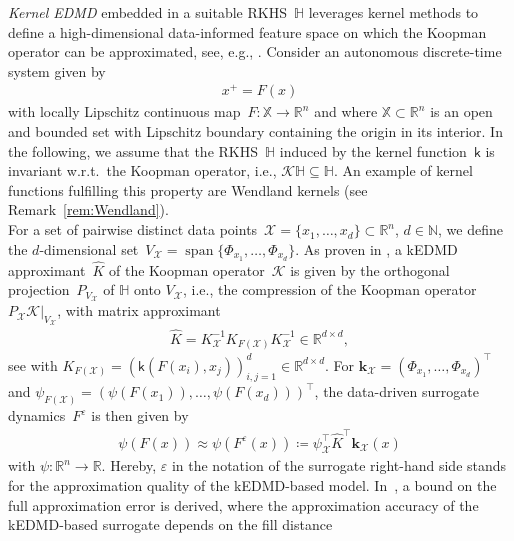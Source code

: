 \documentclass[a4paper, reqno]{amsart}
\newcommand{\R}{\ensuremath{\mathbb R}}
\newcommand{\N}{\ensuremath{\mathbb N}}
\renewcommand{\k}{\mathsf{k}}
\begin{document}
\textit{Kernel EDMD} embedded in a suitable RKHS~$\mathbb{H}$ leverages kernel methods to define a high-dimensional data-informed feature space on which the Koopman operator can be approximated, see, e.g., \cite{will2015kernel,klus2020kernel}. 
Consider an autonomous discrete-time system given by 
\begin{align}\label{eq:sys:ADT}%
    x^+ = F(x)
\end{align}
with locally Lipschitz continuous map~$F:\mathbb{X} \rightarrow \R^n$ and where $\mathbb{X} \subset \R^n$ is an open and bounded set with Lipschitz boundary containing the origin in its interior. In the following, we assume that the RKHS~$\mathbb{H}$ induced by the kernel function~$\k$ is invariant w.r.t.\ the Koopman operator, i.e., $\mathcal{K}\mathbb{H} \subseteq \mathbb{H}$. An example of kernel functions fulfilling this property are Wendland kernels (see Remark~\ref{rem:Wendland}).\\
For a set of pairwise distinct data points~$\mathcal{X} = \{x_1, \dots, x_d\}\subset\R^n$, $d \in \N$, we define the $d$-dimensional set~$V_\mathcal{X} = \operatorname{span}\{\Phi_{x_1}, \dots, \Phi_{x_d}\}$. As proven in \cite[Proposition 3.2]{kohne2025error}, a kEDMD approximant~$\widehat{K}$ of the Koopman operator~$\mathcal{K}$ is given by the orthogonal projection~$P_{V_\mathcal{X}}$ of $\mathbb{H}$ onto $V_\mathcal{X}$, i.e., the compression of the  Koopman operator~$P_\mathcal{X}\mathcal{K}|_{V_{\mathcal{X}}}$, 
with matrix approximant 
\begin{align*}
    \widehat{K} = K_\mathcal{X}^{-1}K_{F(\mathcal{X})}K_\mathcal{X}^{-1} \in \R^{d \times d},
\end{align*}
see \cite{kohne2025error} with $K_{F(\mathcal{X})} = (\k(F(x_i), x_j))_{i, j = 1}^d \in \R^{d \times d}$. 
For 
$\mathbf{k}_\mathcal{X} = (\Phi_{x_1}, \dots, \Phi_{x_d})^\top$ and $\psi_{F(\mathcal{X})} = (\psi(F(x_1)), \dots, \psi(F(x_d)))^\top$, the data-driven surrogate dynamics~$F^\varepsilon$ is then given by 
\begin{align}\label{eq:surr}
    \psi(F(x)) \approx \psi(F^\varepsilon(x)) \coloneqq \psi_\mathcal{X}^\top \widehat{K}^\top\mathbf{k}_\mathcal{X}(x)
\end{align}
with $\psi:\R^n \rightarrow \R$.
Hereby, $\varepsilon$ in the notation of the surrogate right-hand side stands for the approximation quality of the kEDMD-based model. In~\cite[Theorem~5.2]{kohne2025error}, a bound on the full approximation error is derived, where the approximation accuracy of the kEDMD-based surrogate depends on the fill distance
\end{document}
